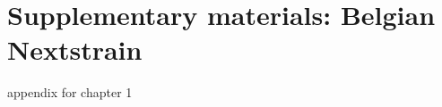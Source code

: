 \chapter{Supplementary materials: Belgian Nextstrain}
\label{appendix_ch1}

appendix for chapter 1

\cleardoublepage

